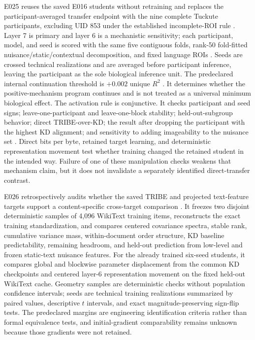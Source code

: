E025 reuses the saved E016 students without retraining and replaces the participant-averaged transfer endpoint with the nine complete Tuckute participants, excluding UID 853 under the established incomplete-ROI rule .
Layer 7 is primary and layer 6 is a mechanistic sensitivity; each participant, model, and seed is scored with the same five contiguous folds, rank-50 fold-fitted nuisance/static/contextual decomposition, and fixed language ROIs .
Seeds are crossed technical realizations and are averaged before participant inference, leaving the participant as the sole biological inference unit.
The predeclared internal continuation threshold is $+0.002$ unique $R^2$ .
It determines whether the positive-mechanism program continues and is not treated as a universal minimum biological effect.
The activation rule is conjunctive.
It checks participant and seed signs; leave-one-participant and leave-one-block stability; held-out-subgroup behavior; direct TRIBE-over-KD; the result after dropping the participant with the highest KD alignment; and sensitivity to adding imageability to the nuisance set .
Direct bits per byte, retained target learning, and deterministic representation movement test whether training changed the retained student in the intended way.
Failure of one of these manipulation checks weakens that mechanism claim, but it does not invalidate a separately identified direct-transfer contrast.

E026 retrospectively audits whether the saved TRIBE and projected text-feature targets support a content-specific cross-target comparison .
It freezes two disjoint deterministic samples of 4,096 WikiText training items, reconstructs the exact training standardization, and compares centered covariance spectra, stable rank, cumulative variance mass, within-document order structure, KD baseline predictability, remaining headroom, and held-out prediction from low-level and frozen static-text nuisance features.
For the already trained six-seed students, it compares global and blockwise parameter displacement from the common KD checkpoints and centered layer-6 representation movement on the fixed held-out WikiText cache.
Geometry samples are deterministic checks without population confidence intervals; seeds are technical training realizations summarized by paired values, descriptive $t$ intervals, and exact magnitude-preserving sign-flip tests.
The predeclared margins are engineering identification criteria rather than formal equivalence tests, and initial-gradient comparability remains unknown because those gradients were not retained.

